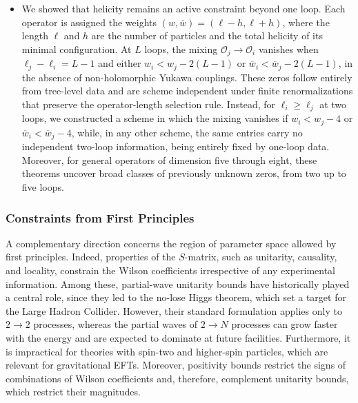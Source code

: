 \begin{itemize}
    \item We showed that helicity remains an active constraint beyond one loop. Each operator is
    assigned the weights $(w,\overline w)=(\ell-h,\ell+h)$, where the length $\ell$ and $h$ are the
    number of particles and the total helicity of its minimal configuration. At $L$ loops, the
    mixing $\mathcal O_j\to\mathcal O_i$ vanishes when $\ell_j-\ell_i=L-1$ and either
    $w_i<w_j-2(L-1)$ or $\overline w_i<\overline w_j-2(L-1)$, in the absence of non-holomorphic
    Yukawa couplings. These zeros follow entirely from tree-level data and are scheme independent
    under finite renormalizations that preserve the operator-length selection rule. Instead, for
    $\ell_i\ge\ell_j$ at two loops, we constructed a scheme in which the mixing vanishes if
    $w_i<w_j-4$ or $\overline w_i<\overline w_j-4$, while, in any other scheme, the same entries
    carry no independent two-loop information, being entirely fixed by one-loop data. Moreover, for general operators
    of dimension five through eight, these theorems uncover broad classes of previously unknown
    zeros, from two up to five loops.
\end{itemize}

\subsubsection*{Constraints from First Principles}

A complementary direction concerns the region of parameter space allowed by first principles.
Indeed, properties of the $S$-matrix, such as unitarity, causality, and locality, constrain
the Wilson coefficients irrespective of any experimental information. Among these, partial-wave
unitarity bounds have historically played a central role, since they led to the no-lose Higgs
theorem, which set a target for the Large Hadron Collider. 
However, their standard formulation applies only to $2\to2$ processes, whereas the partial waves of $2\to N$ processes can grow faster with the energy and are expected to dominate at future facilities. Furthermore, it is impractical for theories with spin-two and higher-spin particles, which are relevant for gravitational EFTs.
Moreover, positivity
bounds restrict the signs of combinations of Wilson
coefficients and, therefore, complement unitarity bounds, which restrict their magnitudes. 

